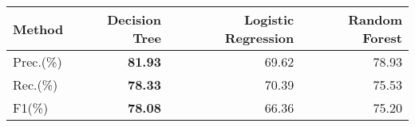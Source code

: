 

\setlength\tabcolsep{2.2pt} %

\begin{table} [!h]
  \centering
  \label{tab:models_prediction}
  
  \begin{tabular}{l|r|r|r}

  \rowcolor{lightgray}  
    \cellcolor{gray}Method & \textbf{Decision Tree} & Logistic Regression & Random Forest\\

    \hline
    \hline
    
    \cellcolor{gray}Prec.(\%) & \textbf{81.93} & 69.62 & 78.93 \\

    \hline
    \hline
        
  \rowcolor{lightgray}
    \cellcolor{gray}Rec.(\%) & \textbf{78.33} & 70.39 & 75.53 \\
    
    \hline
    \hline
    
    \cellcolor{gray}F1(\%) & \textbf{78.08} & 66.36 & 75.20 \\

  \hline
  \end{tabular}
\end{table}

